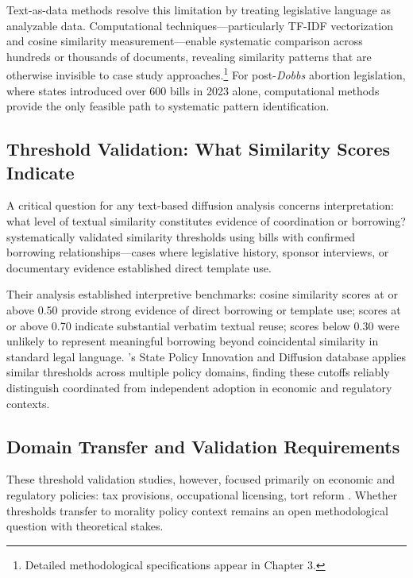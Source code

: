 Text-as-data methods resolve this limitation by treating legislative language as analyzable data. Computational techniques---particularly TF-IDF vectorization and cosine similarity measurement---enable systematic comparison across hundreds or thousands of documents, revealing similarity patterns that are otherwise invisible to case study approaches.\footnote{Detailed methodological specifications appear in Chapter 3.} For post-\emph{Dobbs} abortion legislation, where states introduced over 600 bills in 2023 alone, computational methods provide the only feasible path to systematic pattern identification.

\subsection{Threshold Validation: What Similarity Scores Indicate}
A critical question for any text-based diffusion analysis concerns interpretation: what level of textual similarity constitutes evidence of coordination or borrowing? \textcite{linderTextPolicyMeasuring2020} systematically validated similarity thresholds using bills with confirmed borrowing relationships---cases where legislative history, sponsor interviews, or documentary evidence established direct template use.

Their analysis established interpretive benchmarks: cosine similarity scores at or above 0.50 provide strong evidence of direct borrowing or template use; scores at or above 0.70 indicate substantial verbatim textual reuse; scores below 0.30 were unlikely to represent meaningful borrowing beyond coincidental similarity in standard legal language. \textcite{boehmkeSPID}'s State Policy Innovation and Diffusion database applies similar thresholds across multiple policy domains, finding these cutoffs reliably distinguish coordinated from independent adoption in economic and regulatory contexts.

\subsection{Domain Transfer and Validation Requirements}
These threshold validation studies, however, focused primarily on economic and regulatory policies: tax provisions, occupational licensing, tort reform \parencite{linderTextPolicyMeasuring2020,boehmkeStatePolicyInnovativeness2012a,desmaraisPersistentPolicyPathways2015}. Whether thresholds transfer to morality policy context remains an open methodological question with theoretical stakes.

